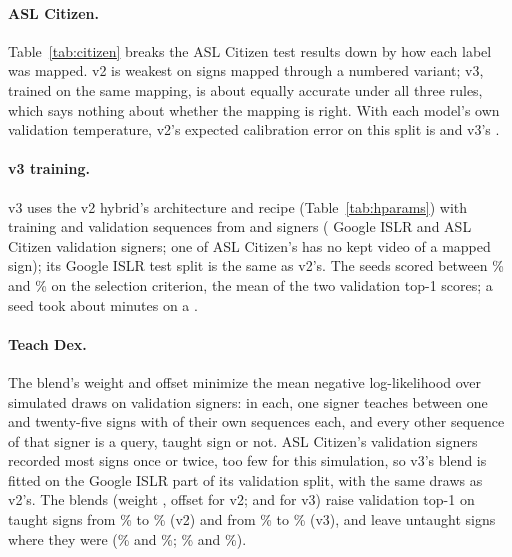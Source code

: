 \paragraph{ASL Citizen.} Table~\ref{tab:citizen} breaks the ASL Citizen test results down by how
each label was mapped. v2 is weakest on signs mapped through a numbered variant; v3, trained on
the same mapping, is about equally accurate under all three rules, which says nothing about
whether the mapping is right. With each model's own validation temperature, v2's expected
calibration error on this split is  and v3's .

\paragraph{v3 training.} v3 uses the v2 hybrid's architecture and recipe
(Table~\ref{tab:hparams}) with  training and  validation sequences from
 and  signers ( Google ISLR and
 ASL Citizen validation signers; one of ASL Citizen's 
has no kept video of a mapped sign); its Google ISLR test split is the same as v2's.
The  seeds scored between \% and \% on the selection
criterion, the mean of the two validation top-1 scores; a seed took about 
minutes on a .

\paragraph{Teach Dex.} The blend's weight and offset minimize the mean negative log-likelihood
over  simulated draws on validation signers: in each, one signer teaches between one
and twenty-five signs with  of their own sequences each, and every other sequence
of that signer is a query, taught sign or not. ASL Citizen's validation signers recorded most signs
once or twice, too few for this simulation, so v3's blend is fitted on the Google ISLR part of its
validation split, with the same draws as v2's. The blends (weight , offset
 for v2;  and  for v3) raise validation top-1 on
taught signs from \% to \% (v2) and from \%
to \% (v3), and leave untaught signs where they were (\%
and \%; \% and \%).

